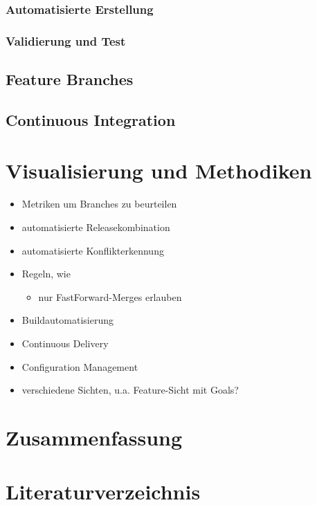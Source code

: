 \documentclass[10pt,a4paper]{book}
\begin{document}
\subsection{Automatisierte Erstellung}
\subsection{Validierung und Test}

\section{Feature Branches}

\section{Continuous Integration}

\chapter{Visualisierung und Methodiken}

\begin{itemize}
\item Metriken um Branches zu beurteilen
\item automatisierte Releasekombination
\item automatisierte Konflikterkennung
\item Regeln, wie 
	\begin{itemize}
		\item nur FastForward-Merges erlauben
	\end{itemize}	 
\item Buildautomatisierung
\item Continuous Delivery
\item Configuration Management
\item verschiedene Sichten, u.a. Feature-Sicht mit Goals?
\end{itemize}

\chapter{Zusammenfassung}


\chapter{Literaturverzeichnis}

\printbibliography
\end{document}
